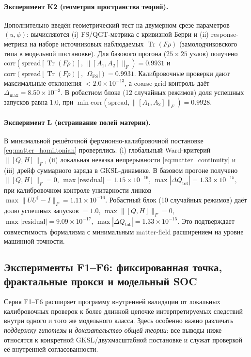 \documentclass[11pt,a4paper]{article}
\DeclareMathOperator{\Tr}{Tr}
\theoremstyle{definition}
\theoremstyle{plain}
\theoremstyle{remark}
\begin{document}
\paragraph{Эксперимент K2 (геометрия пространства теорий).}
Дополнительно введён геометрический тест на двумерном срезе параметров $(u,\phi)$:
вычисляются (i) FS/QGT-метрика с кривизной Берри и (ii) response-метрика на наборе источниковых наблюдаемых
$\Tr(F\rho)$ (замолодчиковского типа в модельной постановке).
Для базового прогона ($25\times25$ узлов) получено
$\mathrm{corr}\!\left(\mathrm{spread}[\Tr(F\rho)],\,\|[A_1,A_2]\|_F\right)=0.9931$
и
$\mathrm{corr}\!\left(\mathrm{spread}[\Tr(F\rho)],\,|\Omega_{\mathrm{FS}}|\right)=0.9931$.
Калибровочные проверки дают максимальные отклонения
$<2.0\times10^{-13}$, а coarse-grid контроль даёт
$\Delta_{\max}=8.50\times10^{-3}$.
В робастном блоке (12 случайных режимов) доля успешных запусков равна $1.0$,
при
$\min\mathrm{corr}\!\left(\mathrm{spread},\|[A_1,A_2]\|_F\right)=0.9928$.

\paragraph{Эксперимент L (встраивание полей материи).}
В минимальной решёточной фермионно-калибровочной постановке \eqref{eq:matter_hamiltonian}
проверялись: (i) глобальный Ward-критерий $\|[Q,H]\|_F$, (ii) локальная невязка непрерывности \eqref{eq:matter_continuity}
и (iii) дрейф суммарного заряда в GKSL-динамике.
В базовом прогоне получено
$\|[Q,H]\|_F=0$,
$\max|\mathrm{residual}|=1.15\times10^{-16}$,
$\max|\Delta Q_{\mathrm{tot}}|=1.33\times10^{-15}$,
при калибровочном контроле унитарности линков
$\max\|UU^\dagger-I\|_F=1.11\times10^{-16}$.
Робастный блок (10 случайных режимов) даёт
долю успешных запусков $=1.0$,
$\max\|[Q,H]\|_F=0$,
$\max|\mathrm{residual}|=9.09\times10^{-17}$,
$\max|\Delta Q_{\mathrm{tot}}|=1.33\times10^{-15}$.
Это подтверждает совместимость формализма с минимальным matter-field расширением на уровне машинной точности.

\subsection{Эксперименты F1--F6: фиксированная точка, фрактальные прокси и модельный SOC}
\label{sec:numerics:Fseries}

Серия F1--F6 расширяет программу внутренней валидации от локальных калибровочных проверок к более длинной
цепочке интерпретируемых следствий внутри одного и того же модельного класса.
Здесь особенно важно различать \emph{поддержку гипотезы} и \emph{доказательство общей теории}:
все выводы ниже относятся к конкретной GKSL/двухмасштабной постановке и служат проверкой её внутренней согласованности.
\end{document}
